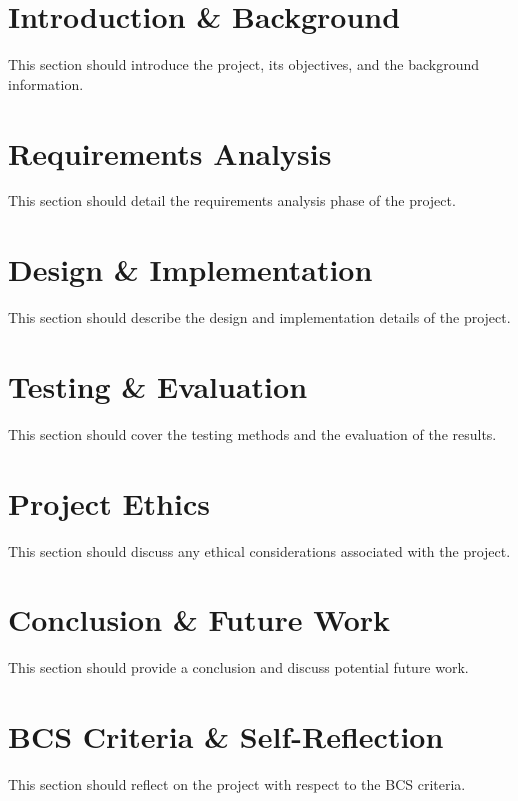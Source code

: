 \documentclass[12pt]{article}
\begin{document}
\section{Introduction \& Background}
This section should introduce the project, its objectives, and the background information.

\section{Requirements Analysis}
This section should detail the requirements analysis phase of the project.

\section{Design \& Implementation}
This section should describe the design and implementation details of the project.

\section{Testing \& Evaluation}
This section should cover the testing methods and the evaluation of the results.

\section{Project Ethics}
This section should discuss any ethical considerations associated with the project.

\section{Conclusion \& Future Work}
This section should provide a conclusion and discuss potential future work.

\section{BCS Criteria \& Self-Reflection}
This section should reflect on the project with respect to the BCS criteria.


\printbibliography
\end{document}
